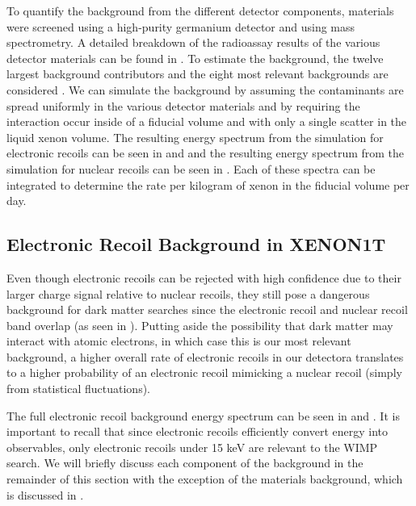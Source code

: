 To quantify the background from the different detector components, materials were screened using a high-purity germanium detector and using mass spectrometry.  A detailed breakdown of the radioassay results of the various detector materials can be found in .  To estimate the background, the twelve largest background contributors and the eight most relevant backgrounds are considered \cite{aprile2016physics}.  We can simulate the background by assuming the contaminants are spread uniformly in the various detector materials and by requiring the interaction occur inside of a fiducial volume and with only a single scatter in the liquid xenon volume.  The resulting energy spectrum from the simulation for electronic recoils can be seen in  and  and the resulting energy spectrum from the simulation for nuclear recoils can be seen in .  Each of these spectra can be integrated to determine the rate per kilogram of xenon in the fiducial volume per day.


\subsection{Electronic Recoil Background in XENON1T}
\label{sec:xe1t_er_bkg}

Even though electronic recoils can be rejected with high confidence due to their larger charge signal relative to nuclear recoils, they still pose a dangerous background for dark matter searches since the electronic recoil and nuclear recoil band overlap (as seen in ).  Putting aside the possibility that dark matter may interact with atomic electrons, in which case this is our most relevant background, a higher  overall rate of electronic recoils in our detectora translates to a higher probability of an electronic recoil mimicking a nuclear recoil (simply from statistical fluctuations).

The full electronic recoil background energy spectrum can be seen in  and .  It is important to recall that since electronic recoils efficiently convert energy into observables, only electronic recoils under 15 keV are relevant to the WIMP search.  We will briefly discuss each component of the background in the remainder of this section with the exception of the materials background, which is discussed in .




